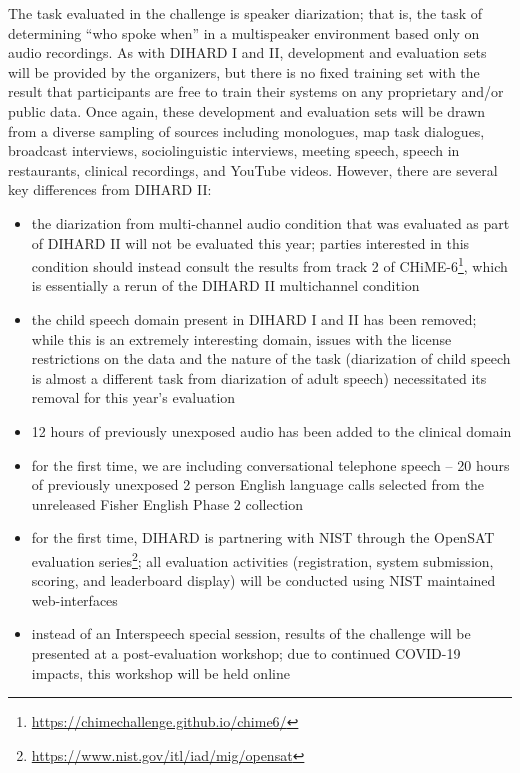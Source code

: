 \documentclass{article}
\begin{document}
The task evaluated in the challenge is speaker diarization; that is, the task of determining ``who spoke when'' in a multispeaker environment based only on audio recordings. As with DIHARD I and II, development and evaluation sets will be provided by the organizers, but there is no fixed training set with the result that participants are free to train their systems on any proprietary and/or public data. Once again, these development and evaluation sets will be drawn from a diverse sampling of sources including monologues, map task dialogues, broadcast interviews, sociolinguistic interviews, meeting speech, speech in restaurants, clinical recordings, and YouTube videos. However, there are several key differences from DIHARD II:
    \begin{itemize}
        \item the diarization from multi-channel audio condition that was evaluated as part of DIHARD II will not be evaluated this year; parties interested in this condition should instead consult the results from track 2 of CHiME-6\footnote{\url{https://chimechallenge.github.io/chime6/}}, which is essentially  a rerun of the DIHARD II multichannel condition
        \item the child speech domain present in DIHARD I and II has been removed; while this is an extremely interesting domain, issues with the license restrictions on the data and the nature of the task (diarization of child speech is almost a different task from diarization of adult speech) necessitated its removal for this year's evaluation
        \item 12 hours of previously unexposed audio has been added to the clinical domain
        \item for the first time, we are including conversational telephone speech  --  20 hours of previously unexposed 2 person English language calls selected from the unreleased Fisher English Phase 2 collection
        \item for the first time, DIHARD is partnering with NIST through the OpenSAT evaluation series\footnote{\url{https://www.nist.gov/itl/iad/mig/opensat}}; all evaluation activities (registration, system submission, scoring, and leaderboard display) will be conducted using NIST maintained web-interfaces
        \item instead of an Interspeech special session, results of the challenge will be presented at a post-evaluation workshop; due to continued COVID-19 impacts, this workshop will be held online
    \end{itemize}
\end{document}
